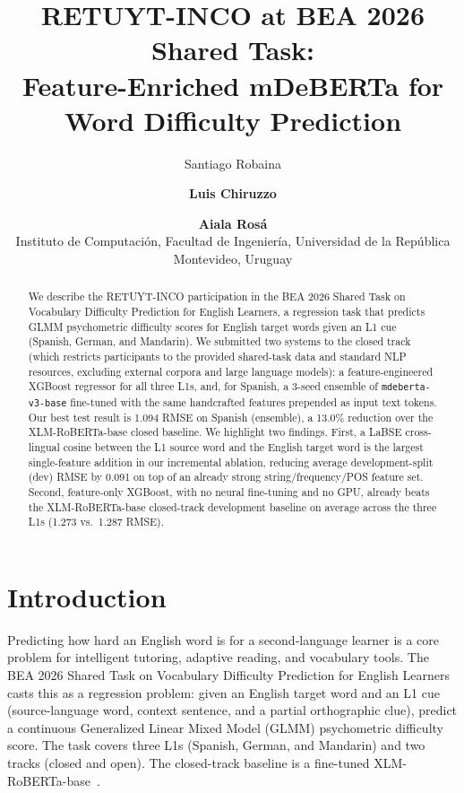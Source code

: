 \documentclass[11pt]{article}
\title{RETUYT-INCO at BEA 2026 Shared Task: \\
Feature-Enriched mDeBERTa for Word Difficulty Prediction}
\author{Santiago Robaina \and {\bf Luis Chiruzzo} \and {\bf Aiala Rosá} \\
Instituto de Computación, Facultad de Ingeniería, Universidad de la República \\
Montevideo, Uruguay}
\begin{document}
\maketitle
\begin{abstract}
We describe the RETUYT-INCO participation in the BEA 2026 Shared Task on Vocabulary Difficulty Prediction for English Learners, a regression task that predicts GLMM psychometric difficulty scores for English target words given an L1 cue (Spanish, German, and Mandarin). We submitted two systems to the closed track (which restricts participants to the provided shared-task data and standard NLP resources, excluding external corpora and large language models): a feature-engineered XGBoost regressor for all three L1s, and, for Spanish, a 3-seed ensemble of \texttt{mdeberta-v3-base} fine-tuned with the same handcrafted features prepended as input text tokens. Our best test result is 1.094 RMSE on Spanish (ensemble), a 13.0\% reduction over the XLM-RoBERTa-base closed baseline. We highlight two findings. First, a LaBSE cross-lingual cosine between the L1 source word and the English target word is the largest single-feature addition in our incremental ablation, reducing average development-split (dev) RMSE by 0.091 on top of an already strong string/frequency/POS feature set. Second, feature-only XGBoost, with no neural fine-tuning and no GPU, already beats the XLM-RoBERTa-base closed-track development baseline on average across the three L1s (1.273 vs.\ 1.287 RMSE).
\end{abstract}


\section{Introduction}
\label{sec:introduction}

Predicting how hard an English word is for a second-language learner is a core problem for intelligent tutoring, adaptive reading, and vocabulary tools. The BEA 2026 Shared Task on Vocabulary Difficulty Prediction for English Learners~\citep{felice2026bea} casts this as a regression problem: given an English target word and an L1 cue (source-language word, context sentence, and a partial orthographic clue), predict a continuous Generalized Linear Mixed Model (GLMM) psychometric difficulty score. The task covers three L1s (Spanish, German, and Mandarin) and two tracks (closed and open). The closed-track baseline is a fine-tuned XLM-RoBERTa-base~\citep{conneau2019xlmroberta}.
\end{document}
